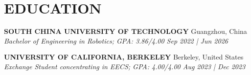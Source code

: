 \documentclass[a4paper,9pt]{extarticle}
\begin{document}
\section*{{\textbf{\fontsize{14pt}{8pt}\selectfont E}\textbf{\scshape DUCATION}}}
{\textbf{\fontsize{12pt}{4pt}\selectfont S}\textbf{\scshape OUTH CHINA UNIVERSITY OF TECHNOLOGY}} \hfill Guangzhou, China\\ %
\textit{Bachelor of Engineering in Robotics; GPA: 3.86/4.00  \hfill Sep 2022 | Jun 2026} %
\par\vspace{4pt}\noindent
{\textbf{\fontsize{12pt}{4pt}\selectfont U}\textbf{\scshape NIVERSITY OF CALIFORNIA, BERKELEY}} \hfill Berkeley, United States\\ %
\textit{Exchange Student concentrating in EECS; GPA: 4.00/4.00 \hfill   Aug 2023 | Dec 2023} %



\end{document}
